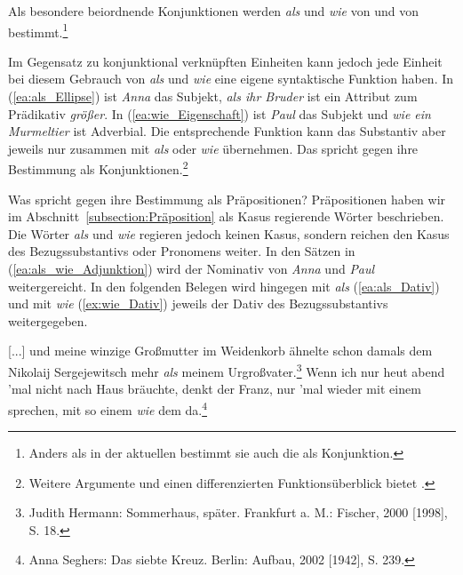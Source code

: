 \ea \label{ea:als_wie_Vgl_Rolle}
\label{ea:wie_Eigenschaft} 
\label{ex:als_Rolle_?Ellipse}
\label{ex:als_Subjunktion}
\label{ex:als_Adjunktion}
\z 
\z 

Als besondere beiordnende Konjunktionen werden \textit{als} und \textit{wie} von \citet[701]{HeidolphFlaemigMotsch1981} und von \citet[224]{Eisenberg2020_Satz} bestimmt.\footnote{Anders als in der aktuellen \citet[822, §1454]{Duden2022} bestimmt sie auch die \citet[625]{Duden2016} als Konjunktion.}

Im Gegensatz zu konjunktional verknüpften Einheiten kann jedoch jede Einheit bei diesem Gebrauch von \textit{als} und \textit{wie} eine eigene syntaktische Funktion haben. In (\ref{ea:als_Ellipse}) ist \textit{Anna} das Subjekt, \textit{als ihr Bruder} ist ein Attribut zum Prädikativ \textit{größer}. In (\ref{ea:wie_Eigenschaft}) ist \textit{Paul} das Subjekt und \textit{wie ein Murmeltier} ist Adverbial. Die entsprechende Funktion kann das Substantiv aber jeweils nur zusammen mit \textit{als} oder \textit{wie} übernehmen. Das spricht gegen ihre Bestimmung als Konjunktionen.\footnote{Weitere Argumente und einen differenzierten Funktionsüberblick bietet \citet{Eggs2009}.}

Was spricht gegen ihre Bestimmung als Präpositionen? Präpositionen haben wir im Abschnitt~\ref{subsection:Präposition} als Kasus regierende Wörter beschrieben. Die Wörter \textit{als} und \textit{wie} regieren jedoch keinen Kasus, sondern reichen den Kasus des Bezugssubstantivs oder Pronomens weiter. In den Sätzen in (\ref{ea:als_wie_Adjunktion}) wird der Nominativ von \textit{Anna} und \textit{Paul} weitergereicht. In den folgenden Belegen wird hingegen mit \textit{als} (\ref{ea:als_Dativ}) und mit \textit{wie} (\ref{ex:wie_Dativ}) jeweils der Dativ des Bezugssubstantivs weitergegeben. 

\ea \label{ea:als_wie_Dativ}
\ea \label{ea:als_Dativ} [...] und meine winzige Großmutter im Weidenkorb ähnelte schon damals dem Nikolaij Sergejewitsch mehr \textit{als} meinem Urgroßvater.\footnote{Judith Hermann: Sommerhaus, später. Frankfurt a. M.: Fischer, 2000 [1998], S. 18.}
\ex \label{ex:wie_Dativ} Wenn ich nur heut abend 'mal nicht nach Haus bräuchte, denkt der Franz, nur 'mal wieder mit einem sprechen, mit so einem \textit{wie} dem da.\footnote{Anna Seghers: Das siebte Kreuz. Berlin: Aufbau, 2002 [1942], S. 239.}
\z 
\z 

